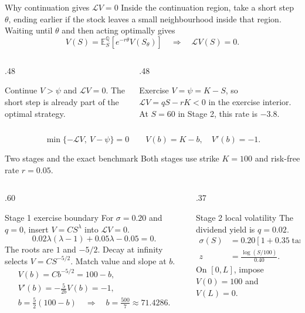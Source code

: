 \documentclass[aspectratio=169,11pt]{beamer}
\newcommand{\Lop}{\mathcal{L}}
\newcommand{\E}{\mathbb{E}}
\begin{document}
\begin{frame}[t]{Why continuation gives $\Lop V=0$}
\small
Inside the continuation region, take a short step $\theta$, ending earlier if the stock
leaves a small neighbourhood inside that region.
Waiting until $\theta$ and then acting optimally gives
\[
 V(S)=\E_S^{\mathbb Q}\!\left[e^{-r\theta}V(S_\theta)\right]
 \quad\Longrightarrow\quad \Lop V(S)=0.
\]
\begin{columns}[T,onlytextwidth]
\begin{column}{.48\textwidth}
\begin{block}{Continue}
$V>\psi$ and $\Lop V=0$. The short step is already part of the optimal strategy.
\end{block}
\end{column}
\begin{column}{.48\textwidth}
\begin{block}{Exercise}
$V=\psi=K-S$, so $\Lop V=qS-rK<0$ in the exercise interior. At $S=60$ in Stage 2, this rate is $-3.8$.
\end{block}
\end{column}
\end{columns}
\[
 \boxed{\min\{-\Lop V,\ V-\psi\}=0}
 \qquad
 V(b)=K-b,\quad V'(b)=-1.
\]
\end{frame}

\begin{frame}[t]{Two stages and the exact benchmark}
\small
Both stages use strike $K=100$ and risk-free rate $r=0.05$.

\begin{columns}[T,onlytextwidth]
\begin{column}{.60\textwidth}
\begin{block}{Stage 1 exercise boundary}
\small
\setlength{\abovedisplayskip}{4pt}
\setlength{\belowdisplayskip}{4pt}
\setlength{\abovedisplayshortskip}{3pt}
\setlength{\belowdisplayshortskip}{3pt}
For $\sigma=0.20$ and $q=0$, insert $V=CS^\lambda$ into $\Lop V=0$.
\[
 0.02\lambda(\lambda-1)+0.05\lambda-0.05=0.
\]
The roots are $1$ and $-5/2$. Decay at infinity selects $V=CS^{-5/2}$.
Match value and slope at $b$.
\[
\begin{gathered}
 V(b)=Cb^{-5/2}=100-b,\\
 V'(b)=-\tfrac{5}{2b}V(b)=-1,\\[.4em]
 b=\tfrac52(100-b)\quad\Longrightarrow\quad
 \boxed{b=\tfrac{500}{7}\approx71.4286}.
\end{gathered}
\]
\end{block}
\end{column}
\begin{column}{.37\textwidth}
\begin{block}{Stage 2 local volatility}
\small
The dividend yield is $q=0.02$.
\[
\begin{aligned}
 \sigma(S)&=0.20[1+0.35\tanh z],\\
 z&=\frac{\log(S/100)}{0.40}.
\end{aligned}
\]
On $[0,L]$, impose $V(0)=100$ and $V(L)=0$.
\end{block}
\end{column}
\end{columns}
\end{frame}
\end{document}
